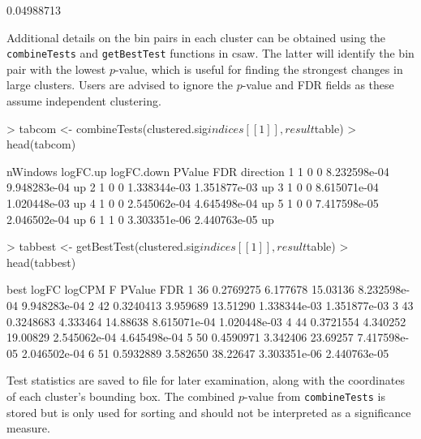 \documentclass[12pt]{report}
\renewenvironment{Schunk}{\vspace{0pt}}{\vspace{0pt}}
\newcommand{\csaw}{csaw}
\newcommand{\code}[1]{{\small\texttt{#1}}}
\begin{document}
\begin{Schunk}
\begin{Soutput}
[1] 0.04988713
\end{Soutput}
\end{Schunk}

Additional details on the bin pairs in each cluster can be obtained using the \code{combineTests} and \code{getBestTest} functions in \csaw{}.
The latter will identify the bin pair with the lowest $p$-value, which is useful for finding the strongest changes in large clusters.
Users are advised to ignore the $p$-value and FDR fields as these assume independent clustering.

\begin{Schunk}
\begin{Sinput}
> tabcom <- combineTests(clustered.sig$indices[[1]], result$table)
> head(tabcom)
\end{Sinput}
\begin{Soutput}
  nWindows logFC.up logFC.down       PValue          FDR direction
1        1        0          0 8.232598e-04 9.948283e-04        up
2        1        0          0 1.338344e-03 1.351877e-03        up
3        1        0          0 8.615071e-04 1.020448e-03        up
4        1        0          0 2.545062e-04 4.645498e-04        up
5        1        0          0 7.417598e-05 2.046502e-04        up
6        1        1          0 3.303351e-06 2.440763e-05        up
\end{Soutput}
\begin{Sinput}
> tabbest <- getBestTest(clustered.sig$indices[[1]], result$table)
> head(tabbest)
\end{Sinput}
\begin{Soutput}
  best     logFC   logCPM        F       PValue          FDR
1   36 0.2769275 6.177678 15.03136 8.232598e-04 9.948283e-04
2   42 0.3240413 3.959689 13.51290 1.338344e-03 1.351877e-03
3   43 0.3248683 4.333464 14.88638 8.615071e-04 1.020448e-03
4   44 0.3721554 4.340252 19.00829 2.545062e-04 4.645498e-04
5   50 0.4590971 3.342406 23.69257 7.417598e-05 2.046502e-04
6   51 0.5932889 3.582650 38.22647 3.303351e-06 2.440763e-05
\end{Soutput}
\end{Schunk}

Test statistics are saved to file for later examination, along with the coordinates of each cluster's bounding box.
The combined $p$-value from \code{combineTests} is stored but is only used for sorting and should not be interpreted as a significance measure.
\end{document}
